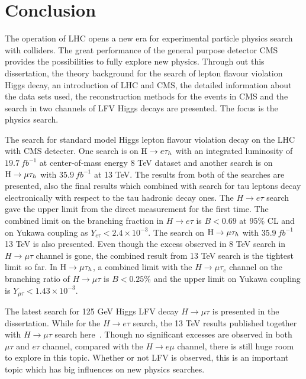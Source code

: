 
\chapter{Conclusion}

The operation of LHC opens a new era for experimental particle physics search with colliders. The great performance of the general purpose detector CMS provides the possibilities to fully explore new physics. Through out this dissertation, the theory background for the search of lepton flavour violation Higgs decay, an introduction of LHC and CMS, the detailed information about the data sets used, the reconstruction methods for the events in CMS and the search in two channels of LFV Higgs decays are presented. The focus is the physics search. 

  
The search for standard model Higgs lepton flavour violation decay on the LHC with CMS detecter. One search is on $\mathrm{H} \to e \tau_{h}$ with an integrated luminosity of $19.7~fb^{-1}$ at center-of-mass energy 8 TeV dataset and another search is on $\mathrm{H}\to \mu\tau_{h}$ with $35.9~fb^{-1}$ at 13 TeV. The results from both of the searches are presented, also the final results which combined with search for tau leptons decay electronically with respect to the tau hadronic decay ones. The $H \to e \tau$ search gave the upper limit from the direct measurement for the first time. The combined limit on the branching fraction in $H \to e\tau$ is $B<0.69$ at 95\% CL and on Yukawa coupling as $Y_{e\tau}<2.4\times10^{-3}$. The search on $\mathrm{H}\to \mu\tau_{h}$ with $35.9~fb^{-1}$ 13 TeV is also presented. Even though the excess observed in 8 TeV search in $H \to \mu \tau$ channel is gone, the combined result from 13 TeV search is the tightest limit so far. In $\mathrm{H}\to \mu\tau_{h}$, a combined limit with the $H \to \mu \tau_{e}$ channel on the branching ratio of $H \to \mu\tau$ is $B<0.25\%$ and the upper limit on Yukawa coupling is $Y_{\mu\tau}<1.43\times10^{-3}$.   

The latest search for 125 GeV Higgs LFV decay $H \to \mu \tau$ is presented in the dissertation. While for the $H \to e \tau$ search, the 13 TeV results published together with $H \to \mu \tau$ search here~\cite{Sirunyan2018}. Though no significant excesses are observed in both $\mu\tau$ and $e\tau$ channel, compared with the $H \to e \mu$ channel, there is still huge room to explore in this topic. Whether or not LFV is observed, this is an important topic which has big influences on new physics searches.  









